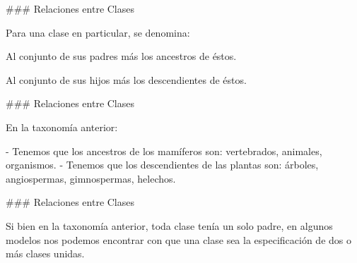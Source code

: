 \centering{}

### Relaciones entre Clases


Para una clase en particular, se denomina:

\begin{description}[leftmargin=3em]
    \item[Ancestros:] Al conjunto de sus padres más los ancestros de éstos.
    \item[Descendientes:] Al conjunto de sus hijos más los descendientes de éstos.
\end{description}


### Relaciones entre Clases


En la taxonomía anterior:

\hspace{4em}\taxonomyOrg[0.5]

- Tenemos que los ancestros de los mamíferos son: {vertebrados, animales, organismos}.
- Tenemos que los descendientes de las plantas son: {árboles, angiospermas, gimnospermas, helechos}.

### Relaciones entre Clases


Si bien en la taxonomía anterior, toda clase tenía un solo padre, en algunos modelos nos podemos
encontrar con que una clase sea la especificación de dos o más clases unidas.\newline

\begin{columns}[t,onlytextwidth]
{
\centering{}
}

{
    \vspace{-33mm}
\centering{}
}
\end{columns}


